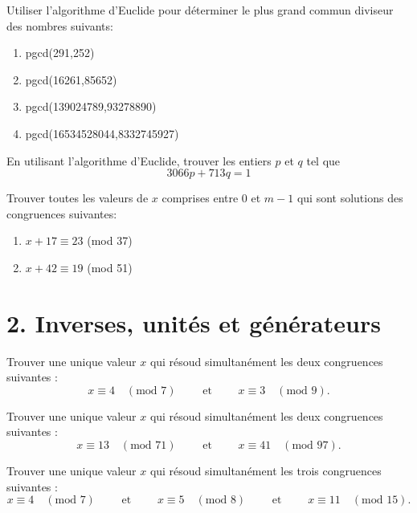 \begin{exercise} %
    Utiliser l'algorithme d'Euclide pour déterminer le plus grand commun diviseur des nombres suivants:
    \begin{enumerate}[label=(\alph*)]
        \item pgcd(291,252)
        \item pgcd(16261,85652)
        \item pgcd(139024789,93278890)
        \item pgcd(16534528044,8332745927)
    \end{enumerate}
\end{exercise}

\begin{exercise} %
    En utilisant l'algorithme d'Euclide, trouver les entiers $p$ et $q$ tel que 
    $$3066p+713q=1$$
\end{exercise}

\begin{exercise} %
    Trouver toutes les valeurs de $x$ comprises entre $0$ et $m-1$ qui sont solutions des congruences suivantes:
    \begin{enumerate}[label=(\alph*)]
        \item $x+17\equiv23$ (mod 37)
        \item $x+42\equiv19$ (mod 51)
    \end{enumerate}
\end{exercise}

\section*{2. Inverses, unités et générateurs}

\begin{exercise}
    Trouver une unique valeur $x$ qui résoud simultanément les deux congruences suivantes :
    $$x\equiv 4 \quad(\text{mod } 7) \qquad \text{ et } \qquad x\equiv3\quad(\text{mod } 9).$$
\end{exercise}
 
\begin{exercise}
     Trouver une unique valeur $x$ qui résoud simultanément les deux congruences suivantes :
     $$x\equiv 13 \quad(\text{mod } 71) \qquad \text{ et } \qquad x\equiv41\quad(\text{mod } 97).$$
\end{exercise}
 
\begin{exercise}
    Trouver une unique valeur $x$ qui résoud simultanément les trois congruences suivantes :
    $$x\equiv 4 \quad(\text{mod } 7) \qquad \text{ et } \qquad x\equiv5\quad(\text{mod } 8) \qquad \text{ et } \qquad x\equiv11\quad(\text{mod } 15).$$
\end{exercise}